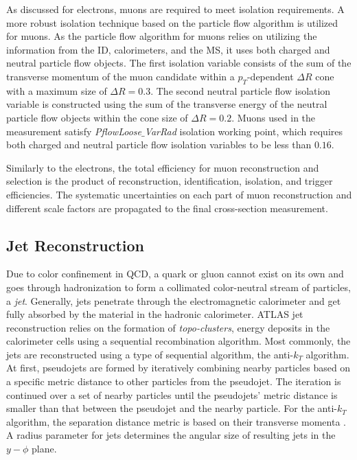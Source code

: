 As discussed for electrons, muons are required to meet isolation requirements. A more robust isolation technique based on the particle flow algorithm is utilized for muons. As the particle flow algorithm for muons relies on utilizing the information from the ID, calorimeters, and the MS, it uses both charged and neutral particle flow objects. The first isolation variable consists of the sum of the transverse momentum of the muon candidate within a $p_{T}$-dependent $\Delta R$ cone with a maximum size of $\Delta R = 0.3$. The second neutral particle flow isolation variable is constructed using the sum of the transverse energy of the neutral particle flow objects within the cone size of $\Delta R = 0.2$. Muons used in the measurement satisfy \textit{PflowLoose$\_$VarRad} isolation working point, which requires both charged and neutral particle flow isolation variables to be less than $0.16$. 

Similarly to the electrons, the total efficiency for muon reconstruction and selection is the product of reconstruction, identification, isolation, and trigger efficiencies. The systematic uncertainties on each part of muon reconstruction and different scale factors are propagated to the final cross-section measurement.

\subsection{Jet Reconstruction}
\label{subsec:ParticleRecon_Jets}

Due to color confinement in QCD, a quark or gluon cannot exist on its own and goes through hadronization to form a collimated color-neutral stream of particles, a \textit{jet}. Generally, jets penetrate through the electromagnetic calorimeter and get fully absorbed by the material in the hadronic calorimeter. ATLAS jet reconstruction relies on the formation of \textit{topo-clusters}, energy deposits in the calorimeter cells using a sequential recombination algorithm. Most commonly, the jets are reconstructed using a type of sequential algorithm, the anti-$k_{T}$ algorithm. At first, pseudojets are formed by iteratively combining nearby particles based on a specific metric distance to other particles from the pseudojet. The iteration is continued over a set of nearby particles until the pseudojets' metric distance is smaller than that between the pseudojet and the nearby particle. For the anti-$k_{T}$ algorithm, the separation distance metric is based on their transverse momenta \cite{AntiKtAlgo}. A radius parameter for jets determines the angular size of resulting jets in the $y-\phi$ plane. 

